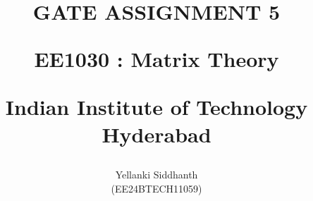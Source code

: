 \documentclass[journal]{IEEEtran}
\begin{document}

\onecolumn
\title{
GATE ASSIGNMENT 5

\large{EE1030 : Matrix Theory}

Indian Institute of Technology Hyderabad
}
\author{Yellanki Siddhanth

(EE24BTECH11059)
}	



\maketitle





\bigskip

\renewcommand{\thefigure}{\theenumi}
\renewcommand{\thetable}{\theenumi}
 
\end{document}
